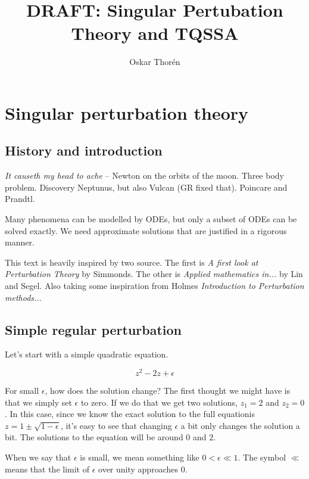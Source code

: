 \documentclass[12pt]{report}
\begin{document}


\title{DRAFT: Singular Pertubation Theory and TQSSA}
\author{Oskar Thor\'{e}n}

\maketitle

\chapter{Singular perturbation theory}

\section{History and introduction}

\textit{It causeth my head to ache} -- Newton on the orbits of the moon. Three
body problem. Discovery Neptunus, but also Vulcan (GR fixed that). Poincare and Prandtl.

Many phenomena can be modelled by ODEs, but only a subset of ODEs can be solved
exactly. We need approximate solutions that are justified in a rigorous manner.

This text is heavily inspired by two source. The first is
\textit{A first look at Perturbation Theory} by Simmonds. The other is
\textit{Applied mathematics in...} by Lin and Segel. Also taking some
inspiration from Holmes \textit{Introduction to Perturbation methods...}

\section{Simple regular perturbation}

Let's start with a simple quadratic equation.

\begin{equation}
  z^2 - 2z + \epsilon
\end{equation}

For small $\epsilon$, how does the solution change? The first thought
we might have is that we simply set $\epsilon$ to zero. If we do that
we get two solutions, $z_1 = 2$ and $z_2 = 0$. In this case, since we
know the exact solution to the full equationis $z = 1 \pm
\sqrt{1-\epsilon}$, it's easy to see that changing $\epsilon$ a bit
only changes the solution a bit. The solutions to the equation will be
around $0$ and $2$.

When we say that $\epsilon$ is small, we mean something like $0 < \epsilon
\ll 1$. The symbol $\ll$ means that the limit of $\epsilon$ over unity
approaches $0$.
\end{document}
